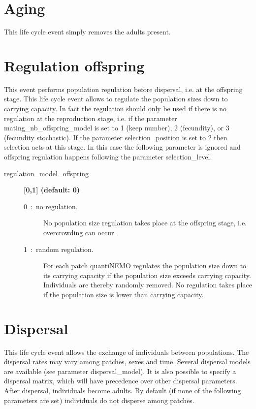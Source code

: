 \documentclass[letterpaper,12pt,oneside]{book}
\begin{document}
\section{Aging}\label{4aging}
This life cycle event simply removes the adults present.


\section{Regulation offspring}\label{5regulation}
This event performs population regulation before dispersal, i.e. at the offspring stage. This life cycle event allows to regulate the population sizes down to carrying capacity. In fact the regulation should only be used if there is no regulation at the reproduction stage, i.e. if the parameter \textsf{mating\_nb\_offspring\_model} is set to 1 (keep number), 2 (fecundity), or 3 (fecundity stochastic). If the parameter \textsf{selection\_position} is set to 2 then selection acts at this stage. In this case the following parameter is ignored and offspring regulation happens following the parameter \textsf{selection\_level}.  

\begin{description}
\item[regulation\_model\_offspring] \textbf{[0,1] (default: 0)}
\begin{description}
\item[0~:~no regulation.] No population size regulation takes place at the offspring stage, i.e. overcrowding can occur.
\item[1~:~random regulation.] For each patch quantiNEMO regulates the population size down to its carrying capacity if the population size exceeds carrying capacity. Individuals are thereby randomly removed. No regulation takes place if the population size is lower than carrying capacity.
\end{description}
\end{description}


\section{Dispersal}\label{6dispersal}
This life cycle event allows the exchange of individuals between populations. The dispersal rates may vary among patches, sexes and time. Several dispersal models are available (see parameter \textsf{dispersal\_model}). It is also possible to specify a dispersal matrix, which will have precedence over other dispersal parameters. After dispersal, individuals become adults. By default (if none of the following parameters are set) individuals do not disperse among patches.
\end{document}
